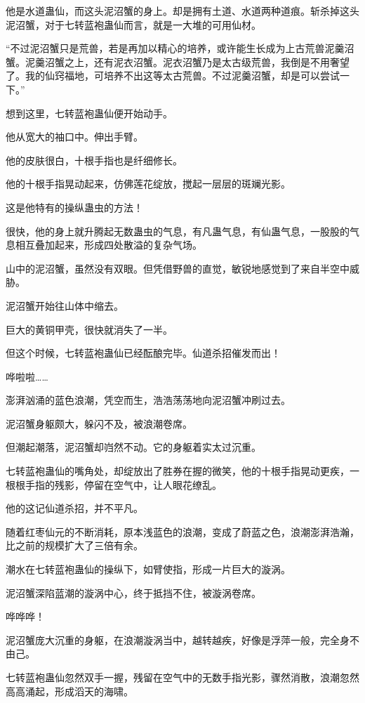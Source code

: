 \begin{this_body}
他是水道蛊仙，而这头泥沼蟹的身上。却是拥有土道、水道两种道痕。斩杀掉这头泥沼蟹，对于七转蓝袍蛊仙而言，就是一大堆的可用仙材。

“不过泥沼蟹只是荒兽，若是再加以精心的培养，或许能生长成为上古荒兽泥羹沼蟹。泥羹沼蟹之上，还有泥衣沼蟹。泥衣沼蟹乃是太古级荒兽，我倒是不用奢望了。我的仙窍福地，可培养不出这等太古荒兽。不过泥羹沼蟹，却是可以尝试一下。”

想到这里，七转蓝袍蛊仙便开始动手。

他从宽大的袖口中。伸出手臂。

他的皮肤很白，十根手指也是纤细修长。

他的十根手指晃动起来，仿佛莲花绽放，搅起一层层的斑斓光影。

这是他特有的操纵蛊虫的方法！

很快，他的身上就升腾起无数蛊虫的气息，有凡蛊气息，有仙蛊气息，一股股的气息相互叠加起来，形成四处散溢的复杂气场。

山中的泥沼蟹，虽然没有双眼。但凭借野兽的直觉，敏锐地感觉到了来自半空中威胁。

泥沼蟹开始往山体中缩去。

巨大的黄铜甲壳，很快就消失了一半。

但这个时候，七转蓝袍蛊仙已经酝酿完毕。仙道杀招催发而出！

哗啦啦……

澎湃汹涌的蓝色浪潮，凭空而生，浩浩荡荡地向泥沼蟹冲刷过去。

泥沼蟹身躯颇大，躲闪不及，被浪潮卷席。

但潮起潮落，泥沼蟹却岿然不动。它的身躯着实太过沉重。

七转蓝袍蛊仙的嘴角处，却绽放出了胜券在握的微笑，他的十根手指晃动更疾，一根根手指的残影，停留在空气中，让人眼花缭乱。

他的这记仙道杀招，并不平凡。

随着红枣仙元的不断消耗，原本浅蓝色的浪潮，变成了蔚蓝之色，浪潮澎湃浩瀚，比之前的规模扩大了三倍有余。

潮水在七转蓝袍蛊仙的操纵下，如臂使指，形成一片巨大的漩涡。

泥沼蟹深陷蓝潮的漩涡中心，终于抵挡不住，被漩涡卷席。

哗哗哗！

泥沼蟹庞大沉重的身躯，在浪潮漩涡当中，越转越疾，好像是浮萍一般，完全身不由己。

七转蓝袍蛊仙忽然双手一握，残留在空气中的无数手指光影，骤然消散，浪潮忽然高高涌起，形成滔天的海啸。


\end{this_body}

